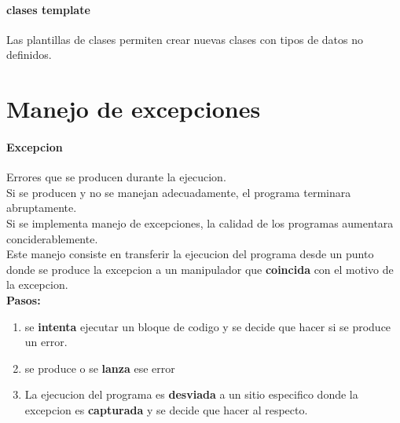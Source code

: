 \documentclass[11pt]{article}
\begin{document}
\paragraph{clases template}
Las plantillas de clases permiten crear nuevas clases con tipos de datos no definidos.
\section{Manejo de excepciones}
\paragraph{Excepcion} Errores que se producen durante la ejecucion.\\
Si se producen y no se manejan adecuadamente, el programa terminara abruptamente.\\
Si se implementa manejo de excepciones, la calidad de los programas aumentara conciderablemente.\\
Este manejo consiste en transferir la ejecucion del programa desde un punto donde se produce la excepcion a un manipulador que \textbf{coincida} con el motivo de la excepcion.\\
\textbf{Pasos:}
\begin{enumerate}
	\item se \textbf{intenta} ejecutar un bloque de codigo y se decide que hacer si se produce un error.
	\item se produce o se \textbf{lanza} ese error
	\item La ejecucion del programa es \textbf{desviada} a un sitio especifico donde la excepcion es \textbf{capturada} y se decide que hacer al respecto.
\end{enumerate}
\end{document}
